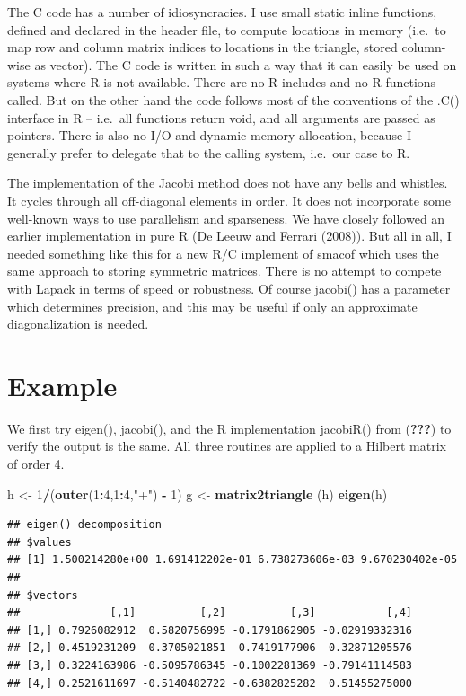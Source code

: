 \documentclass[12pt,]{article}
\newenvironment{Shaded}{\begin{snugshade}}{\end{snugshade}}
\newcommand{\KeywordTok}[1]{\textcolor[rgb]{0.13,0.29,0.53}{\textbf{#1}}}
\newcommand{\DecValTok}[1]{\textcolor[rgb]{0.00,0.00,0.81}{#1}}
\newcommand{\StringTok}[1]{\textcolor[rgb]{0.31,0.60,0.02}{#1}}
\newcommand{\OperatorTok}[1]{\textcolor[rgb]{0.81,0.36,0.00}{\textbf{#1}}}
\newcommand{\NormalTok}[1]{#1}
\begin{document}
The C code has a number of idiosyncracies. I use small static inline
functions, defined and declared in the header file, to compute locations
in memory (i.e.~to map row and column matrix indices to locations in the
triangle, stored column-wise as vector). The C code is written in such a
way that it can easily be used on systems where R is not available.
There are no R includes and no R functions called. But on the other hand
the code follows most of the conventions of the .C() interface in R --
i.e.~all functions return void, and all arguments are passed as
pointers. There is also no I/O and dynamic memory allocation, because I
generally prefer to delegate that to the calling system, i.e.~our case
to R.

The implementation of the Jacobi method does not have any bells and
whistles. It cycles through all off-diagonal elements in order. It does
not incorporate some well-known ways to use parallelism and sparseness.
We have closely followed an earlier implementation in pure R (De Leeuw
and Ferrari (2008)). But all in all, I needed something like this for a
new R/C implement of smacof which uses the same approach to storing
symmetric matrices. There is no attempt to compete with Lapack in terms
of speed or robustness. Of course jacobi() has a parameter which
determines precision, and this may be useful if only an approximate
diagonalization is needed.

\section{Example}\label{example}

We first try eigen(), jacobi(), and the R implementation jacobiR() from
({\textbf{???}}) to verify the output is the same. All three routines
are applied to a Hilbert matrix of order 4.

\begin{Shaded}
\begin{Highlighting}[]
\NormalTok{h <-}\StringTok{ }\DecValTok{1}\OperatorTok{/}\NormalTok{(}\KeywordTok{outer}\NormalTok{(}\DecValTok{1}\OperatorTok{:}\DecValTok{4}\NormalTok{,}\DecValTok{1}\OperatorTok{:}\DecValTok{4}\NormalTok{,}\StringTok{"+"}\NormalTok{) }\OperatorTok{-}\StringTok{ }\DecValTok{1}\NormalTok{)}
\NormalTok{g <-}\StringTok{ }\KeywordTok{matrix2triangle}\NormalTok{ (h)}
\KeywordTok{eigen}\NormalTok{(h)}
\end{Highlighting}
\end{Shaded}

\begin{verbatim}
## eigen() decomposition
## $values
## [1] 1.500214280e+00 1.691412202e-01 6.738273606e-03 9.670230402e-05
## 
## $vectors
##              [,1]          [,2]          [,3]           [,4]
## [1,] 0.7926082912  0.5820756995 -0.1791862905 -0.02919332316
## [2,] 0.4519231209 -0.3705021851  0.7419177906  0.32871205576
## [3,] 0.3224163986 -0.5095786345 -0.1002281369 -0.79141114583
## [4,] 0.2521611697 -0.5140482722 -0.6382825282  0.51455275000
\end{verbatim}
\end{document}
